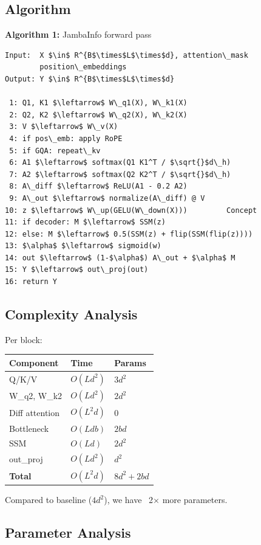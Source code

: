 \subsection{Algorithm}

\textbf{Algorithm 1:} JambaInfo forward pass
\begin{lstlisting}
Input:  X $\in$ R^{B$\times$L$\times$d}, attention\_mask
        position\_embeddings
Output: Y $\in$ R^{B$\times$L$\times$d}

 1: Q1, K1 $\leftarrow$ W\_q1(X), W\_k1(X)
 2: Q2, K2 $\leftarrow$ W\_q2(X), W\_k2(X)
 3: V $\leftarrow$ W\_v(X)
 4: if pos\_emb: apply RoPE
 5: if GQA: repeat\_kv
 6: A1 $\leftarrow$ softmax(Q1 K1^T / $\sqrt{}$d\_h)
 7: A2 $\leftarrow$ softmax(Q2 K2^T / $\sqrt{}$d\_h)
 8: A\_diff $\leftarrow$ ReLU(A1 - 0.2 A2)
 9: A\_out $\leftarrow$ normalize(A\_diff) @ V
10: z $\leftarrow$ W\_up(GELU(W\_down(X)))         Concept
11: if decoder: M $\leftarrow$ SSM(z)
12: else: M $\leftarrow$ 0.5(SSM(z) + flip(SSM(flip(z))))
13: $\alpha$ $\leftarrow$ sigmoid(w)
14: out $\leftarrow$ (1-$\alpha$) A\_out + $\alpha$ M
15: Y $\leftarrow$ out\_proj(out)
16: return Y
\end{lstlisting}

\subsection{Complexity Analysis}

Per block:

\begin{table}[H]
\centering
\small
\begin{tabular}{lll}
\toprule
\textbf{Component} & \textbf{Time} & \textbf{Params} \\
\midrule
Q/K/V & $O(L d^2)$ & $3 d^2$ \\
W\_q2, W\_k2 & $O(L d^2)$ & $2 d^2$ \\
Diff attention & $O(L^2 d)$ & 0 \\
Bottleneck & $O(L d b)$ & $2 b d$ \\
SSM & $O(L d)$ & $2 d^2$ \\
out\_proj & $O(L d^2)$ & $d^2$ \\
\textbf{Total} & $O(L^2 d)$ & $8 d^2 + 2bd$ \\
\bottomrule
\end{tabular}
\end{table}

Compared to baseline ($4 d^2$), we have ~2$\times$ more parameters.

\subsection{Parameter Analysis}

